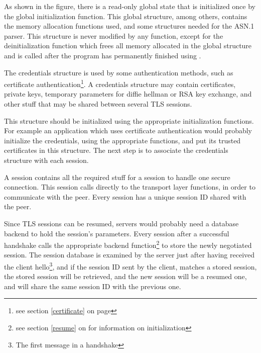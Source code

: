 \par
As shown in the figure, there is a read-only global state that
is initialized once by the global initialization function.
This global structure, among others, contains the memory allocation
functions used, and some structures needed for the ASN.1 parser.
This structure is never modified by any \gnutls{} function, except
for the deinitialization function which frees all memory allocated in
the global structure and is called after the program has permanently finished 
using \gnutls{}.

\par
The credentials structure is used by some authentication methods,
such as certificate authentication\footnote{see section \ref{certificate} on page \pageref{certificate}}.
A credentials structure may contain certificates, private keys, temporary parameters 
for diffie hellman or RSA key exchange, and other stuff that may be shared
between several TLS sessions. 

This structure should be initialized using the appropriate initialization
functions. For example an application which uses certificate authentication
would probably initialize the credentials, using the appropriate functions,
and put its trusted certificates in this structure. The next step is to
associate the credentials structure with each \tls{} session.

\par A \gnutls{} session contains all the required stuff for a
session to handle one secure connection. This session calls directly
to the transport layer functions, in order to communicate with the peer.
Every session has a unique session ID shared with the peer.

\par
Since TLS sessions can be resumed, servers would probably need a database
backend to hold the session's parameters. Every \gnutls{} session after
a successful handshake calls the appropriate backend function\footnote{see section \ref{resume}
on \pageref{resume} for information on initialization} to store the
newly negotiated session. The session database is examined by the server
just after having received the client hello\footnote{The first message
in a \tls{} handshake}, and if the session ID sent by the client,
matches a stored session, the stored session will be retrieved, and the
new session will be a resumed one, and will share the same session ID
with the previous one.






